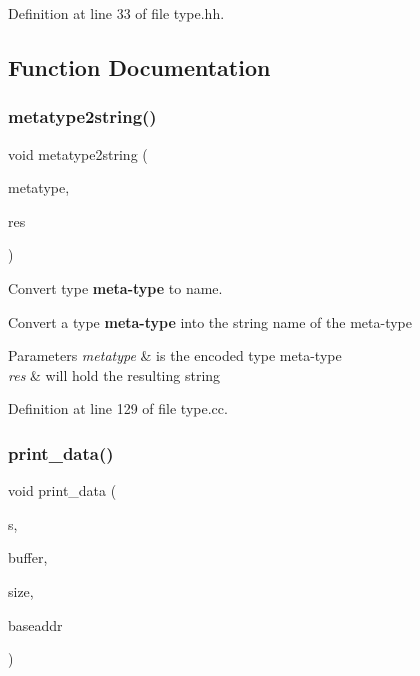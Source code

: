 Definition at line 33 of file type.\+hh.



\subsection{Function Documentation}
\mbox{\label{type_8hh_ab61b3376ec08add3c7e899d703d5f34e}} 
\subsubsection{\texorpdfstring{metatype2string()}{metatype2string()}}
{\footnotesize\ttfamily void metatype2string (\begin{DoxyParamCaption}\item[{\mbox{\hyperlink{type_8hh_aef6429f2523cdf4d415ba04a0209e61f}{type\+\_\+metatype}}}]{metatype,  }\item[{string \&}]{res }\end{DoxyParamCaption})}



Convert type {\bfseries{meta-\/type}} to name. 

Convert a type {\bfseries{meta-\/type}} into the string name of the meta-\/type 
\begin{DoxyParams}{Parameters}
{\em metatype} & is the encoded type meta-\/type \\
\hline
{\em res} & will hold the resulting string \\
\hline
\end{DoxyParams}


Definition at line 129 of file type.\+cc.

\mbox{\label{type_8hh_a796dc3d5c66a81c95642a224e24ddb46}} 
\subsubsection{\texorpdfstring{print\_data()}{print\_data()}}
{\footnotesize\ttfamily void print\+\_\+data (\begin{DoxyParamCaption}\item[{ostream \&}]{s,  }\item[{uint1 $\ast$}]{buffer,  }\item[{int4}]{size,  }\item[{const \mbox{\hyperlink{class_address}{Address}} \&}]{baseaddr }\end{DoxyParamCaption})}



